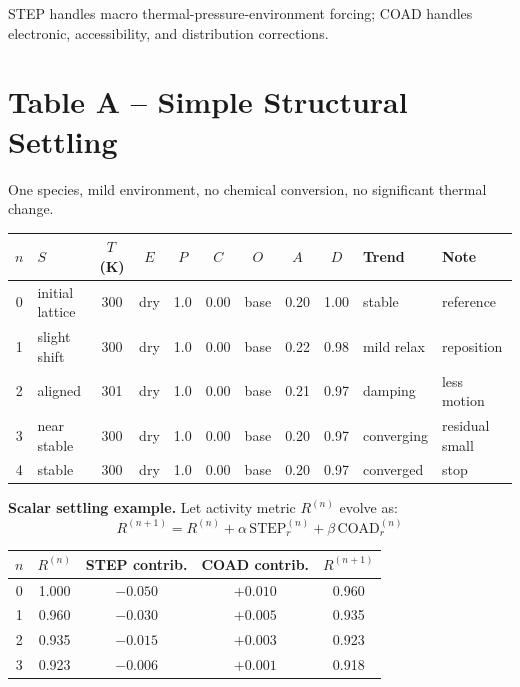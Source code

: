 \documentclass[11pt, letterpaper]{article}
\newcommand{\STEPr}{\mathrm{STEP}_r}
\newcommand{\COADr}{\mathrm{COAD}_r}
\begin{document}
STEP handles macro thermal-pressure-environment forcing;
COAD handles electronic, accessibility, and distribution corrections.

\section{Table A -- Simple Structural Settling}

\noindent
One species, mild environment, no chemical conversion, no significant thermal change.

\bigskip
\noindent
\begin{tabular}{@{}clcccccccll@{}}
\toprule
$n$ & $S$ & $T$\,(K) & $E$ & $P$ & $C$ & $O$ & $A$ & $D$ & Trend & Note \\
\midrule
0 & initial lattice & 300 & dry & 1.0 & 0.00 & base & 0.20 & 1.00 & stable    & reference \\
1 & slight shift    & 300 & dry & 1.0 & 0.00 & base & 0.22 & 0.98 & mild relax & reposition \\
2 & aligned         & 301 & dry & 1.0 & 0.00 & base & 0.21 & 0.97 & damping   & less motion \\
3 & near stable     & 300 & dry & 1.0 & 0.00 & base & 0.20 & 0.97 & converging & residual small \\
4 & stable          & 300 & dry & 1.0 & 0.00 & base & 0.20 & 0.97 & converged & stop \\
\bottomrule
\end{tabular}

\bigskip\noindent
\textbf{Scalar settling example.} Let activity metric $R^{(n)}$ evolve as:
\[
R^{(n+1)} = R^{(n)} + \alpha\,\STEPr^{(n)} + \beta\,\COADr^{(n)}
\]

\medskip
\noindent
\begin{tabular}{@{}ccccc@{}}
\toprule
$n$ & $R^{(n)}$ & STEP contrib. & COAD contrib. & $R^{(n+1)}$ \\
\midrule
0 & 1.000 & $-0.050$ & $+0.010$ & 0.960 \\
1 & 0.960 & $-0.030$ & $+0.005$ & 0.935 \\
2 & 0.935 & $-0.015$ & $+0.003$ & 0.923 \\
3 & 0.923 & $-0.006$ & $+0.001$ & 0.918 \\
\bottomrule
\end{tabular}

\end{document}
